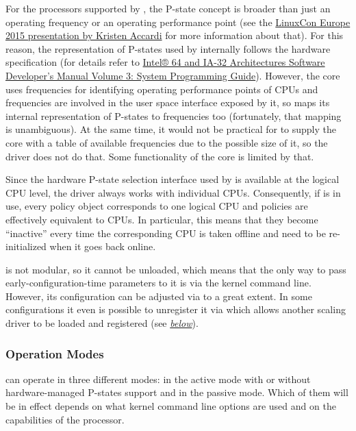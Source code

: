 \documentclass[a4paper,8pt,english]{sphinxmanual}
\begin{document}
For the processors supported by , the P-state concept is broader
than just an operating frequency or an operating performance point (see the
\href{http://events.linuxfoundation.org/sites/events/files/slides/LinuxConEurope\_2015.pdf}{LinuxCon Europe 2015 presentation by Kristen Accardi} for more
information about that).  For this reason, the representation of P-states used
by  internally follows the hardware specification (for details
refer to \href{http://www.intel.com/content/www/us/en/architecture-and-technology/64-ia-32-architectures-software-developer-system-programming-manual-325384.html}{Intel® 64 and IA-32 Architectures Software Developer’s Manual
Volume 3: System Programming Guide}).  However, the  core
uses frequencies for identifying operating performance points of CPUs and
frequencies are involved in the user space interface exposed by it, so
 maps its internal representation of P-states to frequencies too
(fortunately, that mapping is unambiguous).  At the same time, it would not be
practical for  to supply the  core with a table of
available frequencies due to the possible size of it, so the driver does not do
that.  Some functionality of the core is limited by that.

Since the hardware P-state selection interface used by  is
available at the logical CPU level, the driver always works with individual
CPUs.  Consequently, if  is in use, every  policy
object corresponds to one logical CPU and  policies are effectively
equivalent to CPUs.  In particular, this means that they become ``inactive'' every
time the corresponding CPU is taken offline and need to be re-initialized when
it goes back online.

 is not modular, so it cannot be unloaded, which means that the
only way to pass early-configuration-time parameters to it is via the kernel
command line.  However, its configuration can be adjusted via  to a
great extent.  In some configurations it even is possible to unregister it via
 which allows another  scaling driver to be loaded and
registered (see {\hyperref[admin\string-guide/pm/intel_pstate:status\string-attr]{\emph{below}}}\label{admin-guide/pm/intel_pstate:status-attr}).


\subsubsection{Operation Modes}
\label{admin-guide/pm/intel_pstate:operation-modes}
 can operate in three different modes: in the active mode with
or without hardware-managed P-states support and in the passive mode.  Which of
them will be in effect depends on what kernel command line options are used and
on the capabilities of the processor.
\end{document}
